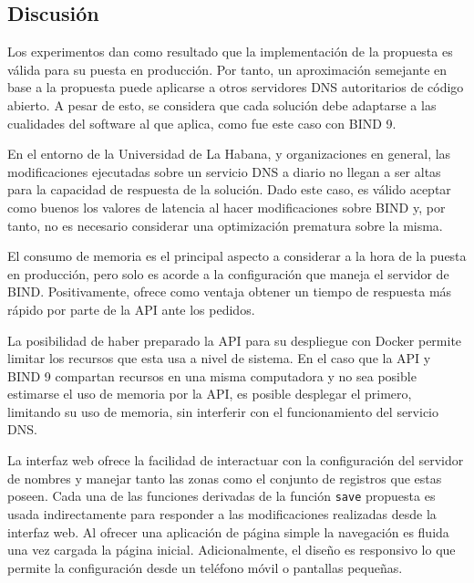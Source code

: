\subsection{Discusión}

Los experimentos dan como resultado que la implementación de la propuesta es válida para su puesta en producción. Por tanto, un aproximación semejante en base a la propuesta puede aplicarse a otros servidores DNS autoritarios de código abierto. A pesar de esto, se considera que cada solución debe adaptarse a las cualidades del software al que aplica, como fue este caso con BIND 9.

En el entorno de la Universidad de La Habana, y organizaciones en general, las modificaciones ejecutadas sobre un servicio DNS a diario no llegan a ser altas para la capacidad de respuesta de la solución. Dado este caso, es válido aceptar como buenos los valores de latencia al hacer modificaciones sobre BIND y, por tanto, no es necesario considerar una optimización prematura sobre la misma.

El consumo de memoria es el principal aspecto a considerar a la hora de la puesta en producción, pero solo es acorde a la configuración que maneja el servidor de BIND. Positivamente, ofrece como ventaja obtener un tiempo de respuesta más rápido por parte de la API ante los pedidos.

La posibilidad de haber preparado la API para su despliegue con Docker permite limitar los recursos que esta usa a nivel de sistema. En el caso que la API y BIND 9 compartan recursos en una misma computadora y no sea posible estimarse el uso de memoria por la API, es posible desplegar el primero, limitando su uso de memoria, sin interferir con el funcionamiento del servicio DNS.

La interfaz web ofrece la facilidad de interactuar con la configuración del servidor de nombres y manejar tanto las zonas como el conjunto de registros que estas poseen. Cada una de las funciones derivadas de la función \verb|save| propuesta es usada indirectamente para responder a las modificaciones realizadas desde la interfaz web. Al ofrecer una aplicación de página simple la navegación es fluida una vez cargada la página inicial. Adicionalmente, el diseño es responsivo lo que permite la configuración desde un teléfono móvil o pantallas pequeñas.